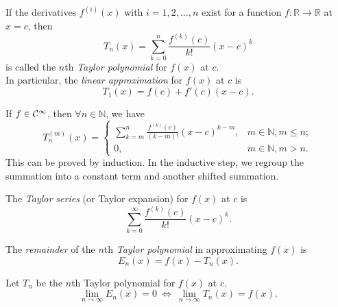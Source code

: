 \begin{defn}
  \label{def:TaylorPolynomial}
  If the derivatives $f^{(i)}(x)$ with $i=1,2,\ldots,n$ exist for a function
  $f: \mathbb{R}\rightarrow \mathbb{R}$ at $x=c$,
   then
   \begin{equation}
     \label{eq:partialSumTaylor}
     T_n(x) = \sum_{k=0}^{n}\frac{f^{(k)}(c)}{k!}(x-c)^k
   \end{equation}
   is called the $n$th \emph{Taylor polynomial} for $f(x)$ at $c$.
\\  In particular, 
the \emph{linear approximation} for $f(x)$ at $c$ is
   \begin{equation}
     \label{eq:linearTaylor}
     T_1(x) = f(c) + f'(c)(x-c).
   \end{equation}
 \end{defn}

 \begin{exm}
   \label{exm:TaylorPoly}
  If $f\in {\cal C}^{\infty}$, then $\forall n\in\mathbb{N}$,
   we have
  \begin{equation*}
    T_n^{(m)}(x) = \left\{
    \begin{array}{ll}
      \sum_{k=m}^n\frac{f^{(k)}(c)}{(k-m)!}(x-c)^{k-m}, &
      m\in\mathbb{N}, m\le n;
      \\
      0, & m\in\mathbb{N}, m> n.
    \end{array}
    \right.
  \end{equation*}
This can be proved by induction.
In the inductive step, we regroup the summation
 into a constant term and another shifted summation.
\end{exm}

\begin{defn}
  \label{def:TaylorSeries}
The \emph{Taylor series} (or Taylor expansion) 
   for $f(x)$ at $c$ is
 \begin{equation}
     \label{eq:TaylorSeries}
     \sum_{k=0}^{\infty}\frac{f^{(k)}(c)}{k!}(x-c)^k.
   \end{equation}
\end{defn}

\begin{defn}
The \emph{remainder} of the $n$th \emph{Taylor polynomial}
 in approximating $f(x)$ is
  \begin{equation}
    \label{eq:TaylorSeriesRemainder}
    E_n(x) = f(x) - T_n(x).
  \end{equation}
\end{defn}

\begin{thm}
  \label{thm:limitTaylorRemainder}
  Let $T_n$ be the $n$th Taylor polynomial for $f(x)$ at $c$.
  \begin{equation}
    \lim_{n\rightarrow\infty} E_n(x) = 0
    \ \Leftrightarrow\
    \lim_{n\rightarrow\infty}T_n(x) = f(x).
  \end{equation}
\end{thm}


